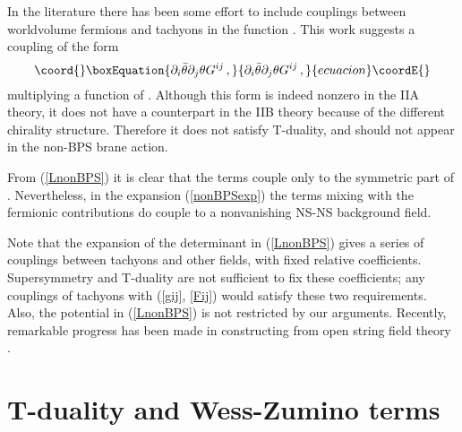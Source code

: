 \documentclass[12pt,a4paper]{article}
\begin{document}
In the literature there has been some effort to include couplings between
 worldvolume fermions and tachyons in the function \coordHE{} \cite{Klus}. This work
 suggests a coupling of the form
\begin{equation}\coord{}\boxEquation{
   \partial_i\bar\theta\partial_j\theta G^{ij}\,,
}{
   \partial_i\bar\theta\partial_j\theta G^{ij}\,,
}{ecuacion}\coordE{}\end{equation}
multiplying a function of \coordHE{}. Although this form is indeed nonzero in the
 IIA theory, it does not have a counterpart in the IIB theory because
 of the different chirality structure.
 Therefore it does not satisfy T-duality, and should not
 appear in the non-BPS brane action.

 From (\ref{LnonBPS}) it is clear that the \coordHE{} terms couple only
 to the symmetric part of \coordHE{}. Nevertheless, in the expansion
 (\ref{nonBPSexp})  the terms mixing \coordHE{} with the
 fermionic contributions do couple to a nonvanishing NS-NS background field.

Note that the expansion of the determinant in (\ref{LnonBPS}) gives a series
 of couplings between tachyons and other fields, with fixed
 relative coefficients. Supersymmetry and T-duality are not sufficient
 to fix these coefficients; any couplings of tachyons
 with (\ref{gij}, \ref{Fij}) would satisfy these two requirements.
 Also, the potential \coordHE{} in (\ref{LnonBPS}) is
 not restricted by our arguments. Recently, remarkable progress has been
 made in constructing \coordHE{} from open string field
 theory \cite{Sen6,Sen7,Tay,Berk}.

\section{T-duality and Wess-Zumino terms}
\end{document}
